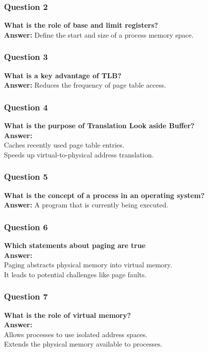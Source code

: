 \documentclass{article}
\begin{document}
\subsubsection*{Question 2}
\textbf{What is the role of base and limit registers?} \\
\textbf{Answer:} Define the start and size of a process memory space.

\subsubsection*{Question 3}
\textbf{What is a key advantage of TLB?} \\
\textbf{Answer:} Reduces the frequency of page table access.

\subsubsection*{Question 4}
\textbf{What is the purpose of Translation Look aside Buffer?} \\
\textbf{Answer:} \\ 
Caches recently used page table entries. \\
Speeds up virtual-to-physical address translation.

\subsubsection*{Question 5}
\textbf{What is the concept of a process in an operating system?} \\
\textbf{Answer:} A program that is currently being executed.

\subsubsection*{Question 6}
\textbf{Which statements about paging are true} \\
\textbf{Answer:} \\
Paging abstracts physical memory into virtual memory. \\
It leads to potential challenges like page faults.

\subsubsection*{Question 7}
\textbf{What is the role of virtual memory?} \\
\textbf{Answer:} \\
Allows processes to use isolated address spaces. \\
Extends the physical memory available to processes.
\end{document}
